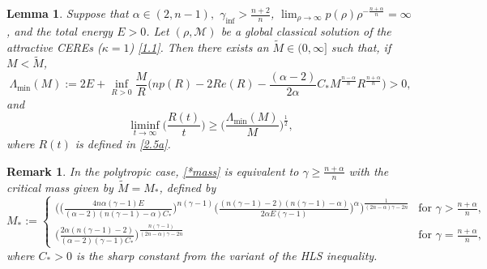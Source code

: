 \documentclass[reqno,11pt]{amsart}
\numberwithin{equation}{section}
\newtheorem{lemma}[theorem]{Lemma}
\newtheorem{remark}[theorem]{Remark}
\theoremstyle{definition}
\begin{document}
\begin{lemma}
Suppose that $\alpha\in(2,n-1),$ $\gamma_{\inf} > \frac{n + 2}{n}$, 
$\lim_{\rho\to\infty}p(\rho)\rho^{-\frac{n+\alpha}{n}} = \infty$, and the total energy $E>0$.
Let $(\rho,\mathcal{M})$ be a global classical solution of the attractive 
CEREs {\rm (}$\kappa = 1${\rm )} \eqref{1.1}. 
Then there exists an $\tilde{M} \in (0,\infty]$ such that, if $M < \tilde{M}$, 
\begin{equation}\label{*mass}
 \Lambda_{\min}(M) := 2E 
 + \inf_{R>0} \frac{M}{R} \Big (np(R) - 2 R e(R) 
 - \frac{(\alpha - 2)}{2\alpha} C_* M^\frac{n-\alpha}{n} R^\frac{n + \alpha}{n} \Big) > 0,
\end{equation}
and
$$
\liminf_{t\rightarrow\infty}\Big(\frac{R(t)}{t}\Big)
\geq\Big(\frac{ \Lambda_{\min}(M)}{M}\Big)^{\frac{1}{2}},
$$
where $R(t)$ is defined in \eqref{2.5a}.
\end{lemma}

\begin{remark}
    In the polytropic case, \eqref{*mass} is equivalent to $\gamma \geq \frac{n + \alpha}{n}$ with the critical mass given by $\tilde{M} = M_*$, defined by
\[
 M_* := \begin{cases}
  \bigg ( \Big( \frac{4n\alpha (\gamma - 1) E}{(\alpha - 2)(n(\gamma - 1) - \alpha)C_*} 
  \Big )^{n(\gamma - 1)} 
\Big( \frac{(n(\gamma - 1) - 2)(n(\gamma - 1) - \alpha)}{2\alpha E(\gamma - 1)} \Big)^\alpha  
 \bigg )^\frac{1}{(2n - \alpha)\gamma - 2n} & \mbox{for $\gamma > \frac{n + \alpha}{n}$}, \\
 \bigg ( \frac{2\alpha (n(\gamma -1) - 2)}{(\alpha - 2)(\gamma - 1)C_*} \bigg )^\frac{n(\gamma -1)}{(2n-\alpha)\gamma - 2n} & \mbox{for $\gamma = \frac{n + \alpha}{n}$},
\end{cases} 
\]
where $C_* > 0$ is the sharp constant from the variant of the HLS inequality.
\end{remark}
\end{document}
